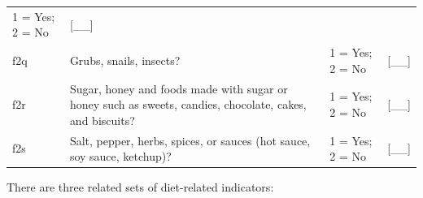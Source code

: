 \documentclass[12pt,a4paper]{book}
\theoremstyle{definition}
\theoremstyle{definition}
\theoremstyle{definition}
\theoremstyle{remark}
\begin{document}
\begin{longtable}[]{@{}llll@{}}
\begin{minipage}[t]{0.25\columnwidth}
1 = Yes; 2 = No\strut
\end{minipage} & \begin{minipage}[t]{0.13\columnwidth}\raggedright
{[}\_\_{]}\strut
\end{minipage}\tabularnewline
\begin{minipage}[t]{0.09\columnwidth}\raggedright
f2q\strut
\end{minipage} & \begin{minipage}[t]{0.41\columnwidth}\raggedright
Grubs, snails, insects?\strut
\end{minipage} & \begin{minipage}[t]{0.25\columnwidth}\raggedright
1 = Yes; 2 = No\strut
\end{minipage} & \begin{minipage}[t]{0.13\columnwidth}\raggedright
{[}\_\_{]}\strut
\end{minipage}\tabularnewline
\begin{minipage}[t]{0.09\columnwidth}\raggedright
f2r\strut
\end{minipage} & \begin{minipage}[t]{0.41\columnwidth}\raggedright
Sugar, honey and foods made with sugar or honey such as sweets, candies,
chocolate, cakes, and biscuits?\strut
\end{minipage} & \begin{minipage}[t]{0.25\columnwidth}\raggedright
1 = Yes; 2 = No\strut
\end{minipage} & \begin{minipage}[t]{0.13\columnwidth}\raggedright
{[}\_\_{]}\strut
\end{minipage}\tabularnewline
\begin{minipage}[t]{0.09\columnwidth}\raggedright
f2s\strut
\end{minipage} & \begin{minipage}[t]{0.41\columnwidth}\raggedright
Salt, pepper, herbs, spices, or sauces (hot sauce, soy sauce,
ketchup)?\strut
\end{minipage} & \begin{minipage}[t]{0.25\columnwidth}\raggedright
1 = Yes; 2 = No\strut
\end{minipage} & \begin{minipage}[t]{0.13\columnwidth}\raggedright
{[}\_\_{]}\strut
\end{minipage}\tabularnewline
\bottomrule
\end{longtable}

There are three related sets of diet-related indicators:
\end{document}
